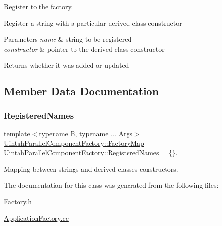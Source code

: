 Register to the factory. 

Register a string with a particular derived class constructor


\begin{DoxyParams}{Parameters}
{\em name} & string to be registered \\
\hline
{\em constructor} & pointer to the derived class constructor \\
\hline
\end{DoxyParams}
\begin{DoxyReturn}{Returns}
whether it was added or updated 
\end{DoxyReturn}


\subsection{Member Data Documentation}
\mbox{\label{classUintah_1_1PhaseField_1_1Factory_a22f376fae678b41bc28047d7e517e622}} 
\subsubsection{\texorpdfstring{Registered\+Names}{RegisteredNames}}
{\footnotesize\ttfamily template$<$typename B, typename ... Args$>$ \\
\hyperlink{classUintah_1_1PhaseField_1_1Factory_aedb6067c58282efa01a12ad72414e0ac}{Uintah\+Parallel\+Component\+Factory\+::\+Factory\+Map} Uintah\+Parallel\+Component\+Factory\+::\+Registered\+Names = \{\}\hspace{0.3cm}{\ttfamily [static]}, {\ttfamily [protected]}}



Mapping between strings and derived classes constructors. 



The documentation for this class was generated from the following files\+:\begin{DoxyCompactItemize}
\item 
\hyperlink{Factory_8h}{Factory.\+h}\item 
\hyperlink{ApplicationFactory_8cc}{Application\+Factory.\+cc}\end{DoxyCompactItemize}
